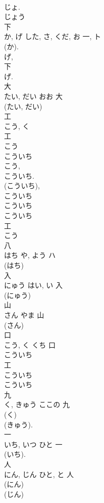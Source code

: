 \documentclass[8pt]{extreport}
\begin{document}
\begin{CJK}{UTF8}{min}
\\	じょ. 
\\	じょう 
\\	下	
\\	か, げ	した, さ, くだ, お	一, ト	
\\	(か). 
\\	げ, 
\\	下 
\\	げ. 
\\	大	
\\	たい, だい	おお	大	
\\	(たい, だい) 
\\	工	
\\	こう, く	
\\	工	
\\	こう 
\\	こういち 
\\	こう, 
\\	こういち. 
\\	(こういち), 
\\	こういち 
\\	こういち
\\	こういち 
\\	工 
\\	こう 
\\	八	
\\	はち	や, よう	ハ	
\\	(はち) 
\\	入	
\\	にゅう	はい, い	入	
\\	(にゅう) 
\\	山	
\\	さん	やま	山	
\\	(さん) 
\\	口	
\\	こう, く	くち	口	
\\	こういち 
\\	工 
\\	こういち
\\	こういち 
\\	九	
\\	く, きゅう	ここの	九	
\\	(く) 
\\	(きゅう). 
\\	一	
\\	いち, いつ	ひと	一	
\\	(いち).	
\\	人	
\\	にん, じん	ひと, と	人	
\\	(にん) 
\\	(じん) 

\end{CJK}
\end{document}
